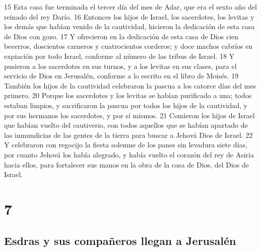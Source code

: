 15 Esta casa fue terminada el tercer día del mes de Adar, que era el sexto año del reinado del rey Darío.
16 Entonces los hijos de Israel, los sacerdotes, los levitas y los demás que habían venido de la cautividad, hicieron la dedicación de esta casa de Dios con gozo.
17 Y ofrecieron en la dedicación de esta casa de Dios cien becerros, doscientos carneros y cuatrocientos corderos; y doce machos cabríos en expiación por todo Israel, conforme al número de las tribus de Israel.
18 Y pusieron a los sacerdotes en sus turnos, y a los levitas en sus clases, para el servicio de Dios en Jerusalén, conforme a lo escrito en el libro de Moisés.
19 También los hijos de la cautividad celebraron la pascua a los catorce días del mes primero. 
20 Porque los sacerdotes y los levitas se habían purificado a una; todos estaban limpios, y sacrificaron la pascua por todos los hijos de la cautividad, y por sus hermanos los sacerdotes, y por sí mismos.
21 Comieron los hijos de Israel que habían vuelto del cautiverio, con todos aquellos que se habían apartado de las inmundicias de las gentes de la tierra para buscar a Jehová Dios de Israel.
22 Y celebraron con regocijo la fiesta solemne de los panes sin levadura siete días, por cuanto Jehová los había alegrado, y había vuelto el corazón del rey de Asiria hacia ellos, para fortalecer sus manos en la obra de la casa de Dios, del Dios de Israel.

\chapter{7}

\section*{Esdras y sus compañeros llegan a Jerusalén}

